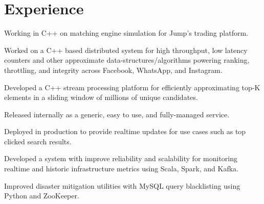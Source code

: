 \documentclass[]{resume}
\begin{document}
\begin{minipage}[t]{0.66\textwidth}


\section{Experience}

\vspace{\topsep} %
\begin{tightemize}
\item Working in C++ on matching engine simulation for Jump's trading platform.
\end{tightemize}
\sectionsep

\begin{tightemize}
\item Worked on a C++ based distributed system for high throughput, low latency counters and other approximate data-structures/algorithms powering ranking, throttling, and integrity across Facebook, WhatsApp, and Instagram.
\end{tightemize}
\sectionsep

\begin{tightemize}
\item Developed a C++ stream processing platform for efficiently approximating top-K elements in a sliding window of millions of unique candidates.
\item Released internally as a generic, easy to use, and fully-managed service.
\item Deployed in production to provide realtime updates for use cases such as top clicked search results.
\end{tightemize}
\sectionsep

\begin{tightemize}
\item Developed a system with improve reliability and scalability for monitoring realtime and historic infrastructure metrics using Scala, Spark, and Kafka.
\item Improved disaster mitigation utilities with MySQL query blacklisting using Python and ZooKeeper.
\end{tightemize}
\sectionsep


\end{minipage}
\end{document}
